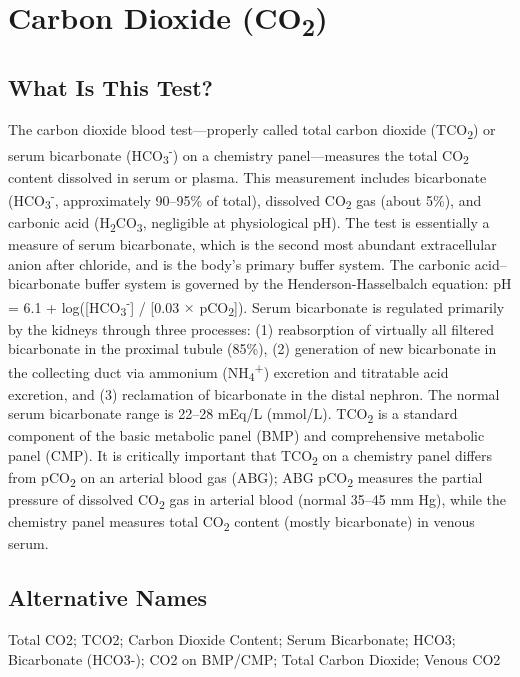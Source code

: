 \chapter{Carbon Dioxide (CO\textsubscript{2})}

\section*{What Is This Test?}
The carbon dioxide blood test---properly called total carbon dioxide (TCO\textsubscript{2}) or serum bicarbonate (HCO\textsubscript{3}\textsuperscript{-}) on a chemistry panel---measures the total CO\textsubscript{2} content dissolved in serum or plasma. This measurement includes bicarbonate (HCO\textsubscript{3}\textsuperscript{-}, approximately 90--95\% of total), dissolved CO\textsubscript{2} gas (about 5\%), and carbonic acid (H\textsubscript{2}CO\textsubscript{3}, negligible at physiological pH). The test is essentially a measure of serum bicarbonate, which is the second most abundant extracellular anion after chloride, and is the body's primary buffer system. The carbonic acid--bicarbonate buffer system is governed by the Henderson-Hasselbalch equation: pH = 6.1 + log([HCO\textsubscript{3}\textsuperscript{-}] / [0.03 $\times$ pCO\textsubscript{2}]). Serum bicarbonate is regulated primarily by the kidneys through three processes: (1) reabsorption of virtually all filtered bicarbonate in the proximal tubule (85\%), (2) generation of new bicarbonate in the collecting duct via ammonium (NH\textsubscript{4}\textsuperscript{+}) excretion and titratable acid excretion, and (3) reclamation of bicarbonate in the distal nephron. The normal serum bicarbonate range is 22--28 mEq/L (mmol/L). TCO\textsubscript{2} is a standard component of the basic metabolic panel (BMP) and comprehensive metabolic panel (CMP). It is critically important that TCO\textsubscript{2} on a chemistry panel differs from pCO\textsubscript{2} on an arterial blood gas (ABG); ABG pCO\textsubscript{2} measures the partial pressure of dissolved CO\textsubscript{2} gas in arterial blood (normal 35--45 mm Hg), while the chemistry panel measures total CO\textsubscript{2} content (mostly bicarbonate) in venous serum.

\section*{Alternative Names}
Total CO2; TCO2; Carbon Dioxide Content; Serum Bicarbonate; HCO3; Bicarbonate (HCO3-); CO2 on BMP/CMP; Total Carbon Dioxide; Venous CO2

